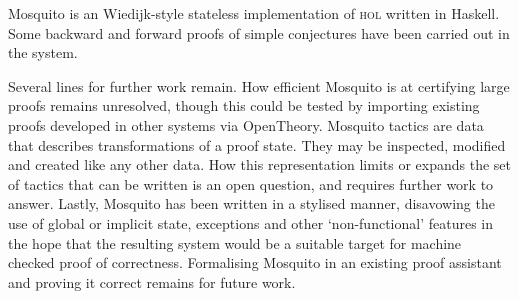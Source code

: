 \documentclass{llncs}
\newcommand{\mosquito}{Mosquito\xspace}
\begin{document}
\mosquito is an Wiedijk-style stateless implementation of \textsc{hol} written in Haskell.
Some backward and forward proofs of simple conjectures have been carried out in the system.

Several lines for further work remain.
How efficient \mosquito is at certifying large proofs remains unresolved, though this could be tested by importing existing proofs developed in other systems via OpenTheory.
\mosquito tactics are data that describes transformations of a proof state.
They may be inspected, modified and created like any other data.
How this representation limits or expands the set of tactics that can be written is an open question, and requires further work to answer.
Lastly, \mosquito has been written in a stylised manner, disavowing the use of global or implicit state, exceptions and other `non-functional' features in the hope that the resulting system would be a suitable target for machine checked proof of correctness.
Formalising \mosquito in an existing proof assistant and proving it correct remains for future work.


\end{document}
